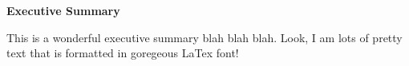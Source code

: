 \begin{titlepage}


\begin{center}
	\begin{large}
		\textbf{Executive Summary}
		\vskip 0.2cm
	\end{large}
\end{center}

\begin{normalsize}

This is a wonderful executive summary blah blah blah.  Look, I am lots of pretty text that is formatted in goregeous LaTex font!

\end{normalsize}

\end{titlepage}
